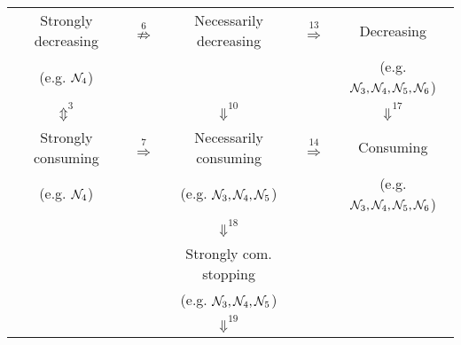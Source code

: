 \begin{table}[ht]
\begin{center}
\begin{tabular}{ccccc}
     \multicolumn{1}{|c|}{{\cellcolor{lightlightblue}}Strongly decreasing}      & $\stackrel{6}{\not\Rightarrow}$   &    
        \multicolumn{1}{|c|}{{\cellcolor{lightlightblue}}Necessarily decreasing} & $\stackrel{13}{\Rightarrow}$ & 
            \multicolumn{1}{|c|}{{\cellcolor{lightlightblue}}Decreasing}  \\
     
     \multicolumn{1}{|c|}{{\cellcolor{lightlightblue}}(e.g. $\mathcal{N}_4$)} &   &  
        \multicolumn{1}{|c|}{{\cellcolor{lightlightblue}}}&  &
            \multicolumn{1}{|c|}{{\cellcolor{lightlightblue}}(e.g. $\mathcal{N}_3,\mathcal{N}_4,\mathcal{N}_5,\mathcal{N}_6$)} \\

     \multicolumn{1}{|c|}{{\cellcolor{lightlightblue}}$\Updownarrow^3$}         &   &
        \multicolumn{1}{|c|}{{\cellcolor{lightlightblue}}$\Downarrow^{10}$} & & 
            \multicolumn{1}{|c|}{{\cellcolor{lightlightblue}}$\Downarrow^{17}$}\\ 
   
     \multicolumn{1}{|c|}{{\cellcolor{lightlightblue}}Strongly consuming}       &  $\stackrel{7}{\Rightarrow}$  &    
        \multicolumn{1}{|c|}{{\cellcolor{lightlightblue}}Necessarily consuming} & $\stackrel{14}{\Rightarrow}$ & 
            \multicolumn{1}{|c|}{{\cellcolor{lightlightblue}} Consuming}  \\
     
     \multicolumn{1}{|c|}{{\cellcolor{lightlightblue}}(e.g. $\mathcal{N}_4$)} &   &  
        \multicolumn{1}{|c|}{{\cellcolor{lightlightblue}}(e.g. $\mathcal{N}_3,\mathcal{N}_4,\mathcal{N}_5$)}&  &
            \multicolumn{1}{|c|}{{\cellcolor{lightlightblue}}(e.g. $\mathcal{N}_3,\mathcal{N}_4,\mathcal{N}_5,\mathcal{N}_6$)} \\

    \hhline{|-|~|-|~|-|}

    &   &  \multicolumn{1}{c}{\rule{0pt}{3.3ex}$\Downarrow^{18}$} & & 
            \\ 
    
    \hhline{|~|~|-|~|~|}                
            

    &   &   
        \multicolumn{1}{|c|}{{\cellcolor{lightlightblue}}Strongly com. stopping} & & 
            \\

    &   &   
        \multicolumn{1}{|c|}{{\cellcolor{lightlightblue}}(e.g. $\mathcal{N}_3,\mathcal{N}_4,\mathcal{N}_5$)} & & 
            \\

    &   &     
        \multicolumn{1}{|c|}{{\cellcolor{lightlightblue}}$\Downarrow^{19}$} & & 
            \\ 


\end{tabular}
\end{center}
\end{table}
